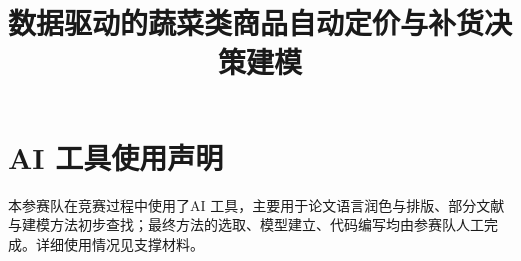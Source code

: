 \documentclass[withoutpreface,bwprint]{cumcmthesis}
\title{数据驱动的蔬菜类商品自动定价与补货决策建模}
\begin{document}
\maketitle













\section*{AI 工具使用声明}
本参赛队在竞赛过程中使用了AI 工具，主要用于论文语言润色与排版、部分文献与建模方法初步查找；最终方法的选取、模型建立、代码编写均由参赛队人工完成。详细使用情况见支撑材料。

\clearpage



\clearpage

\end{document}
